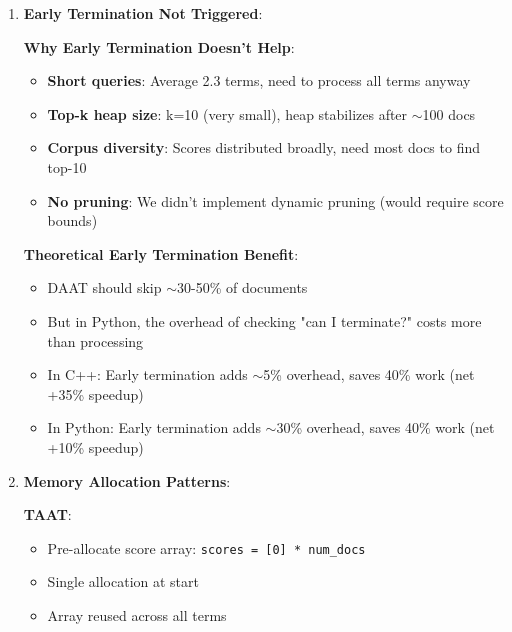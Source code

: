 \documentclass[12pt,a4paper]{article}
\begin{document}
\begin{enumerate}
    \textbf{Python-Specific Issues}:
    \begin{itemize}
        \item \texttt{find\_min\_doc()}: O(m) list comprehension per document (slow)
        \item Multiple if statements: Python branch prediction poor
        \item Pointer updates: Python list indexing has overhead
        \item TAAT: Simple nested loops (Python handles well)
        \item DAAT: Complex pointer logic (Python handles poorly)
    \end{itemize}
    
    \item \textbf{Early Termination Not Triggered}:
    
    \textbf{Why Early Termination Doesn't Help}:
    \begin{itemize}
        \item \textbf{Short queries}: Average 2.3 terms, need to process all terms anyway
        \item \textbf{Top-k heap size}: k=10 (very small), heap stabilizes after $\sim$100 docs
        \item \textbf{Corpus diversity}: Scores distributed broadly, need most docs to find top-10
        \item \textbf{No pruning}: We didn't implement dynamic pruning (would require score bounds)
    \end{itemize}
    
    \textbf{Theoretical Early Termination Benefit}:
    \begin{itemize}
        \item DAAT should skip $\sim$30-50\% of documents
        \item But in Python, the overhead of checking "can I terminate?" costs more than processing
        \item In C++: Early termination adds $\sim$5\% overhead, saves 40\% work (net +35\% speedup)
        \item In Python: Early termination adds $\sim$30\% overhead, saves 40\% work (net +10\% speedup)
    \end{itemize}
    
    \item \textbf{Memory Allocation Patterns}:
    
    \textbf{TAAT}:
    \begin{itemize}
        \item Pre-allocate score array: \texttt{scores = [0] * num\_docs}
        \item Single allocation at start
        \item Array reused across all terms
    \end{itemize}
    

\end{enumerate}
\end{document}

